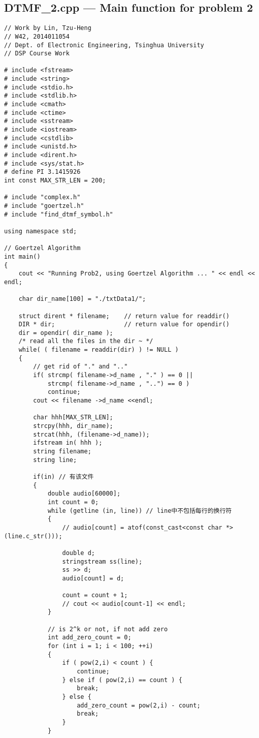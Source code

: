 \subsection{DTMF\_2.cpp --- Main function for problem 2}\label{dtmf2}
\begin{lstlisting}
// Work by Lin, Tzu-Heng
// W42, 2014011054
// Dept. of Electronic Engineering, Tsinghua University
// DSP Course Work

# include <fstream>
# include <string>
# include <stdio.h>
# include <stdlib.h>
# include <cmath>
# include <ctime>
# include <sstream>
# include <iostream>
# include <cstdlib>
# include <unistd.h>  
# include <dirent.h>  
# include <sys/stat.h>  
# define PI 3.1415926
int const MAX_STR_LEN = 200;  

# include "complex.h"
# include "goertzel.h"
# include "find_dtmf_symbol.h"

using namespace std;

// Goertzel Algorithm
int main()
{
	cout << "Running Prob2, using Goertzel Algorithm ... " << endl << endl;

	char dir_name[100] = "./txtData1/"; 

    struct dirent * filename;    // return value for readdir()  
    DIR * dir;                   // return value for opendir()  
    dir = opendir( dir_name );  
    /* read all the files in the dir ~ */  
    while( ( filename = readdir(dir) ) != NULL )  
    {  
        // get rid of "." and ".."  
        if( strcmp( filename->d_name , "." ) == 0 ||   
            strcmp( filename->d_name , "..") == 0 )  
            continue;  
        cout << filename ->d_name <<endl;  
    
    	char hhh[MAX_STR_LEN];
    	strcpy(hhh, dir_name);
    	strcat(hhh, (filename->d_name));
		ifstream in( hhh );
		string filename;
		string line;
		
		if(in) // 有该文件  
		{
			double audio[60000];
			int count = 0;
			while (getline (in, line)) // line中不包括每行的换行符
			{
				// audio[count] = atof(const_cast<const char *>(line.c_str()));

				double d;
				stringstream ss(line);
				ss >> d;
				audio[count] = d;

				count = count + 1;
				// cout << audio[count-1] << endl;
			}

			// is 2^k or not, if not add zero
			int add_zero_count = 0;
			for (int i = 1; i < 100; ++i)
			{
				if ( pow(2,i) < count ) {
					continue;
				} else if ( pow(2,i) == count ) {
					break;
				} else {
					add_zero_count = pow(2,i) - count;
					break;
				}
			}


\end{lstlisting}
